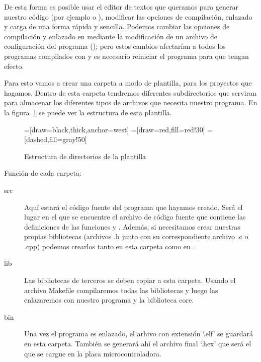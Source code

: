 De esta forma es posible usar el editor de textos que queramos para generar nuestro código (por ejemplo  o ), modificar las opciones de compilación, enlazado y carga de una forma rápida y sencilla. Podemos cambiar las opciones de compilación y enlazado en  mediante la modificación de un archivo de configuración del programa (); pero estos cambios afectarían a todos los programas compilados con  y es necesario reiniciar el programa para que tengan efecto.

Para esto vamos a crear una carpeta a modo de plantilla, para los proyectos que hagamos. Dentro de esta carpeta tendremos diferentes subdirectorios que serviran para almacenar los diferentes tipos de archivos que necesita nuestro programa. En la figura~\ref{plantilla_carpeta} se puede ver la estructura de esta plantilla.

\begin{figure}[H]
\begin{center}
=[draw=black,thick,anchor=west]
=[draw=red,fill=red!30]
=[dashed,fill=gray!50]
\end{center}
\caption{Estructura de directorios de la plantilla}
\label{plantilla_carpeta}
\end{figure}

Función de cada carpeta:
\begin{description}
	\item[src] Aquí estará el código fuente del programa que hayamos creado. Será el lugar en el que se encuentre el archivo de código fuente  que contiene las definiciones de las funciones  y . Además, si necesitamos crear nuestras propias bibliotecas (archivos .h junto con su correspondiente archivo .c o .cpp) podemos crearlos tanto en esta carpeta como en .
	\item[lib] Las bibliotecas de terceros se deben copiar a esta carpeta. Usando el archivo Makefile compilaremos todas las bibliotecas y luego las enlazaremos con nuestro programa y la biblioteca core.
	\item[bin] Una vez el programa es enlazado, el arhivo con extensión `.elf' se guardará en esta carpeta. También se generará ahí el archivo final `.hex' que será el que se cargue en la placa microcontroladora.
\end{description}

